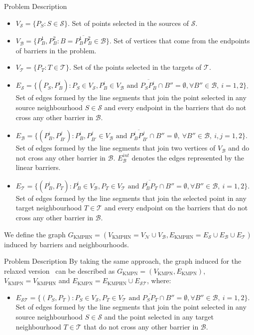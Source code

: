 \documentclass[slidestop,usepdftitle=false,10pt]{beamer}
\newcommand{\KMPHN}{{\sf{H-KMPHN}}}
\newcommand{\KMPN}{{\sf{H-KMPN}\xspace }}
\newcommand{\B}{{\mathcal B}}
\newcommand{\VB}{{V^{}_{\mathcal B}}}
\newcommand{\EB}{{E^{}_{\mathcal B}}}
\newcommand{\EBint}{{E^{int}_{\mathcal B}}}
\newcommand{\VS}{{V^{}_{\mathcal S}}}
\newcommand{\ES}{{E^{}_{\mathcal S}}}
\newcommand{\VT}{{V^{}_{\mathcal T}}}
\newcommand{\ET}{{E^{}_{\mathcal T}}}
\newcommand{\VN}{{V^{}_{\mathcal N}}}
\newcommand{\EST}{{E^{}_{\mathcal S\mathcal T}}}
\newcommand{\GKMPHN}{{G_{\text{KMPHN}}}}
\newcommand{\VKMPHN}{{V_{\text{KMPHN}}}}
\newcommand{\EKMPHN}{{E_{\text{KMPHN}}}}
\newcommand{\GKMPN}{{G_{\text{KMPN}}}}
\newcommand{\VKMPN}{{V_{\text{KMPN}}}}
\newcommand{\EKMPN}{{E_{\text{KMPN}}}}
\begin{document}
	\begin{frame}{Problem Description \KMPHN}
		\footnotesize

		\begin{itemize}
			\item $\VS=\{P_S:S\in\mathcal S\}$. Set of points selected in the sources of $\mathcal S$.
			\item $\VB=\{P^1_B, P^2_B:B=\overline{P^1_B P^2_B}\in \mathcal B\}$. Set of vertices that come from the endpoints of barriers in the problem.
			\item $\VT=\{P^{}_T:T\in\mathcal T\}$. Set of the points selected in the targets of $\mathcal T$.
			\item $\ES=\{(P_S, P^i_{B}):P_S\in\VS, P^i_B\in V_\B\text{ and } \overline{P_SP^i_B}\cap B''=\emptyset,\forall B''\in\B,\:i=1,2\}$. Set of edges formed by the line segments that join the point selected in any source neighbourhood $S\in \mathcal{S}$ and every endpoint in the barriers that do not cross any other barrier in $\B$.
			\item $\EB=\{(P^{i}_B, P^{j}_{B'}):P^i_B, P^j_{B'}\in \VB \text{ and } \overline{P^i_B P^j_{B'}}\cap B''=\emptyset,\:\forall B''\in\mathcal B,\:i, j=1,2\}$. Set of edges formed by the line segments that join two vertices of $V_{\mathcal B}$ and do not cross any other barrier in $\B$. $\EBint$ denotes the edges represented by the linear barriers.
			\item $\ET=\{(P^i_{B}, P^{}_T):P^i_B\in V_\B, P_T\in\VT\text{ and } \overline{P^i_BP^{}_T}\cap B''=\emptyset,\forall B''\in\B,\:i=1,2\}$. Set of edges formed by the line segments that join the selected point in any target neighbourhood $T\in \mathcal{T}$ and every endpoint on the barriers that do not cross any other barrier in $\B$.
		\end{itemize} 
			
		We define the graph $\GKMPHN= (\VKMPHN=\VN\cup\VB, \EKMPHN=\ES\cup\EB\cup\ET)$ induced by barriers and neighbourhoods.
	\end{frame}

	\begin{frame}{Problem Description \KMPN}
		By taking the same approach, the graph induced for the relaxed version \KMPN \ can be described as $\GKMPN= (\VKMPN, \EKMPN)$, $\VKMPN= \VKMPHN$ and $\EKMPN=\EKMPHN\cup \EST$, where:
		\begin{itemize}
			\item $\EST=\{(P_S, P_T):P_S\in\VS, P_T\in\VT \text{ and } \overline{P_SP_T}\cap B''=\emptyset,\forall B''\in\B,\:i=1,2\}$. Set of edges formed by the line segments that join the point selected in any source neighbourhood $S\in \mathcal{S}$ and the point selected in any target neighbourhood $T\in \mathcal{T}$ that do not cross any other barrier in $\B$.
		\end{itemize}
	\end{frame}
\end{document}
